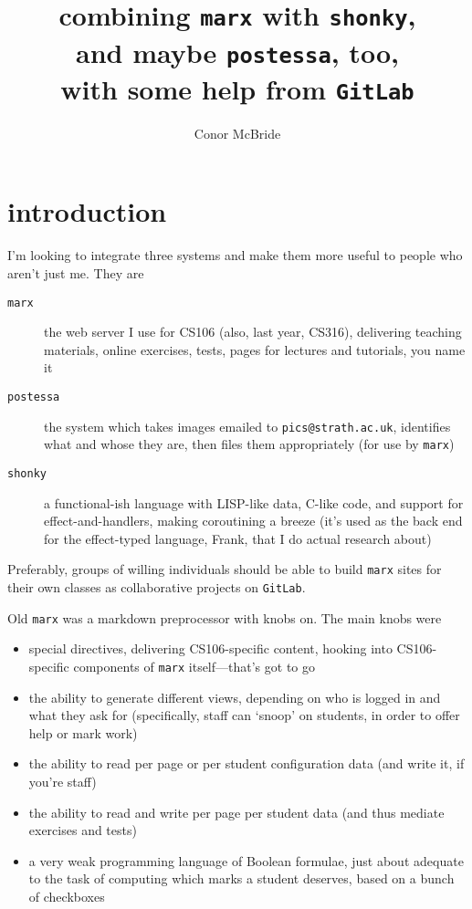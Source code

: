 \documentclass{article}
\begin{document}
\title{combining {\tt marx} with {\tt shonky},\\
       and maybe {\tt postessa}, too,\\
       with some help from {\tt GitLab}}
\author{Conor McBride}
\maketitle

\section{introduction}

I'm looking to integrate three systems and make them more useful to people who aren't just me. They are
\begin{description}
\item[\tt marx] the web server I use for CS106 (also, last year, CS316), delivering teaching materials, online exercises, tests, pages for lectures and tutorials, you name it
\item[\tt postessa] the system which takes images emailed to {\tt pics@strath.ac.uk}, identifies what and whose they are, then files them appropriately (for use by {\tt marx})
\item[\tt shonky] a functional-ish language with LISP-like data, C-like code, and support for effect-and-handlers, making coroutining a breeze (it's used as the back end for the effect-typed language, Frank, that I do actual research about)
\end{description}
Preferably, groups of willing individuals should be able to build {\tt marx} sites for their own classes as collaborative projects on {\tt GitLab}.

Old {\tt marx} was a markdown preprocessor with knobs on. The main knobs were
\begin{itemize}
\item special directives, delivering CS106-specific content, hooking into CS106-specific components of {\tt marx} itself---that's got to go
\item the ability to generate different views, depending on who is logged in and what they ask for (specifically, staff can `snoop' on students, in order to offer help or mark work)
\item the ability to read per page or per student configuration data (and write it, if you're staff)
\item the ability to read and write per page per student data (and thus mediate exercises and tests)
\item a very weak programming language of Boolean formulae, just about adequate to the task of computing which marks a student deserves, based on a bunch of checkboxes
\end{itemize}
\end{document}
